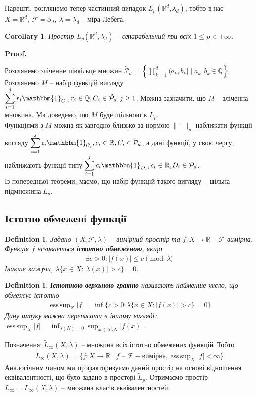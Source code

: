 \documentclass[a4paper, 10pt]{article}
\makeatletter
\theoremstyle{theoremdd}
\newtheorem{definition}[theorem]{Definition}
\newtheorem{corollary}[theorem]{Corollary}
\DeclareMathOperator*{\esssup}{ess\,sup}
\renewenvironment{proof}[1][Proof.\\]{\par
\pushQED{\hfill \qed}%
\normalfont \topsep6\p@\@plus6\p@\relax
\trivlist
\item\relax
{\bfseries
#1\@addpunct{.}}\hspace\labelsep\ignorespaces
}{%
\popQED\endtrivlist\@endpefalse
}
\makeatother
\begin{document}
\noindent
Нарешті, розглянемо тепер частинний випадок $L_p(\mathbb{R}^d,\lambda_d)$, тобто в нас $X = \mathbb{R}^d,\ \mathcal{F} = \mathcal{S}_d,\ \lambda = \lambda_d$ -- міра Лебега.
\begin{corollary}
Простір $L_p(\mathbb{R}^d,\lambda_d)$ -- сепарабельний при всіх $1 \leq p < +\infty$.
\end{corollary}

\begin{proof}
Розглянемо зліченне півкільце множин $\displaystyle \tilde{\mathcal{P}}_d = \left\{ \prod_{k=1}^d (a_k,b_k] \mid a_k,b_k \in \mathbb{Q} \right\}$. Розглянемо $M$ -- набір функцій вигляду $\displaystyle\sum_{i=1}^j r_i \mathbbm{1}_{C_i}, r_i \in \mathbb{Q}, C_i \in \tilde{\mathcal{P}}_d, j \geq 1$. Можна зазначити, що $M$ -- зліченна множина. Ми доведемо, що $M$ буде щільною в $L_p$.\\
Функціями з $M$ можна як завгодно близько за нормою $\| \cdot \|_p$ наближати функції вигляду $\displaystyle\sum_{i=1}^j c_i \mathbbm{1}_{C_i}, c_i \in \mathbb{R}, C_i \in \tilde{\mathcal{P}}_d$, а дані функції, у свою чергу, наближають функції типу $\displaystyle\sum_{i=1}^j c_i \mathbbm{1}_{D_i}, c_i \in \mathbb{R}, D_i \in \mathcal{P}_d$.\\
Із попередньої теореми, маємо, що набір функцій такого вигляду -- щільна підмножина $L_p$.
\end{proof}

\subsection{Істотно обмежені функції}
\begin{definition}
Задано $(X,\mathcal{F},\lambda)$ -- вимірний простір та $f \colon X \to \mathbb{R}$ -- $\mathcal{F}$-вимірна.\\
Функція $f$ називається \textbf{істотно обмеженою}, якщо
\begin{align*}
\exists c > 0: |f(x)| \leq c \pmod \lambda
\end{align*}
Інакше кажучи, $\lambda\{x \in X: |\lambda(x)| > c\} = 0$.
\end{definition}

\begin{definition}
\textbf{Істотною верхьною гранню} називають найменше число, що обмежує істотно
\begin{align*}
\esssup_X |f| = \inf \{c > 0: \lambda\{x \in X: |f(x)| > c\} = 0 \}
\end{align*}
Дану штуку можна переписати в іншому вигляді: $\displaystyle\esssup_X |f| = \inf_{\lambda(N) = 0} \sup_{x \in X \setminus N} |f(x)|$.
\end{definition}
\noindent Позначення: $\tilde{L}_\infty(X,\lambda)$ -- множина всіх істотно обмежених функцій. Тобто
\begin{align*}
\tilde{L}_\infty(X,\lambda) = \{f \colon X \to \mathbb{R} \mid f \text{ -- } \mathcal{F}-\text{вимірна}, \esssup_X |f| < \infty\}
\end{align*}
Аналогічним чином ми профакторизуємо даний простір на основі відношення еквівалентності, що було задано в просторі $\tilde{L}_p$. Отримаємо простір $L_\infty = L_\infty(X,\lambda)$ -- множина класів еквівалентностей.
\end{document}
